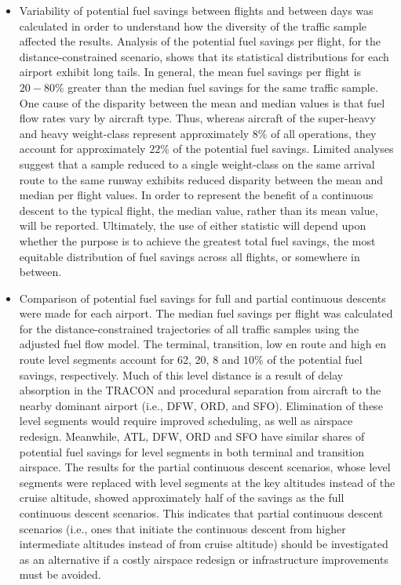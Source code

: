 \documentclass{aer1315-pretty}
\begin{document}
\begin{itemize}
\begin{itemize}    
\item Variability of potential fuel savings between flights and between days was calculated in order to understand how the diversity of the traffic sample affected the results. Analysis of the potential fuel savings per flight, for the distance-constrained scenario, shows that its statistical distributions for each airport exhibit long tails. In general, the mean fuel savings per flight is $20-80\%$ greater than the median fuel savings for the same traffic sample. One cause of the disparity between the mean and median values is that fuel flow rates vary by aircraft type. Thus, whereas aircraft of the super-heavy and heavy weight-class represent approximately $8\%$ of all operations, they account for approximately $22\%$ of the potential fuel savings. Limited analyses suggest that a sample reduced to a single weight-class on the same arrival route to the same runway exhibits reduced disparity between the mean and median per flight values. In order to represent the benefit of a continuous descent to the typical flight, the median value, rather than its mean value, will be reported. Ultimately, the use of either statistic will depend upon whether the purpose is to achieve the greatest total fuel savings, the most equitable distribution of fuel savings across all flights, or somewhere in between.

\item Comparison of potential fuel savings for full and partial continuous descents were made for each airport. The median fuel savings per flight was calculated for the distance-constrained trajectories of all traffic samples using the adjusted fuel flow model. The terminal, transition, low en route and high en route level segments account
for 62, 20, 8 and $10\%$ of the potential fuel savings, respectively.  Much of this level distance is a result of delay absorption in the TRACON and procedural separation from aircraft to the nearby dominant airport (i.e., DFW, ORD, and SFO). Elimination of these level segments would require improved scheduling, as well as airspace redesign. Meanwhile, ATL, DFW, ORD and SFO have similar shares of potential fuel savings for level segments in both terminal and transition airspace. The results for the partial continuous descent scenarios, whose level segments were replaced with level segments at the key altitudes instead of the cruise altitude, showed approximately half of the savings as the full continuous descent scenarios. This indicates that partial continuous descent scenarios (i.e., ones that initiate the continuous descent from higher intermediate altitudes instead of from cruise altitude) should be investigated as an alternative if a costly airspace redesign or infrastructure improvements must be avoided.


\end{itemize}
\end{itemize}
\end{document}
